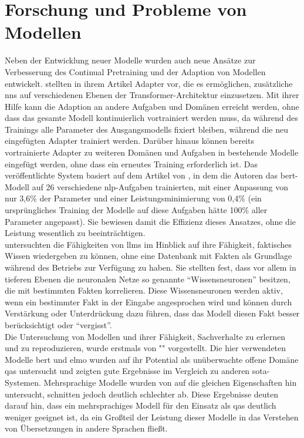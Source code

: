 \section{Forschung und Probleme von Modellen}
Neben der Entwicklung neuer Modelle wurden auch neue Ansätze zur Verbesserung des Continual Pretraining und der Adaption von Modellen entwickelt. 
\citet{adapterhub} stellten in ihrem Artikel Adapter vor, die es ermöglichen, zusätzliche \ac{nn}s auf verschiedenen Ebenen der Transformer-Architektur einzusetzen.
Mit ihrer Hilfe kann die Adaption an andere Aufgaben und Domänen erreicht werden, ohne dass das gesamte Modell kontinuierlich vortrainiert werden muss, da während des Trainings alle Parameter des Ausgangsmodells fixiert bleiben, während die neu eingefügten Adapter trainiert werden.
Darüber hinaus können bereits vortrainierte Adapter zu weiteren Domänen und Aufgaben in bestehende Modelle eingefügt werden, ohne dass ein erneutes Training erforderlich ist.
Das veröffentlichte System basiert auf dem Artikel von \citet{adapter_build_on}, in dem die Autoren das \ac{bert}-Modell auf 26 verschiedene \ac{nlp}-Aufgaben trainierten, mit einer Anpassung von nur 3,6\% der Parameter und einer Leistungsminimierung von 0,4\% (ein ursprüngliches Training der Modelle auf diese Aufgaben hätte 100\% aller Parameter angepasst). Sie bewiesen damit die Effizienz dieses Ansatzes, ohne die Leistung wesentlich zu beeinträchtigen.\\

\citet{knowledge_neurons} untersuchten die Fähigkeiten von \ac{llm}s im Hinblick auf ihre Fähigkeit, faktisches Wissen wiedergeben zu können, ohne eine Datenbank mit Fakten als Grundlage während des Betriebs zur Verfügung zu haben.
Sie stellten fest, dass vor allem in tieferen Ebenen die neuronalen Netze so genannte \enquote{Wissensneuronen} besitzen, die mit bestimmten Fakten korrelieren.
Diese Wissensneuronen werden aktiv, wenn ein bestimmter Fakt in der Eingabe angesprochen wird und können durch Verstärkung oder Unterdrückung dazu führen, dass das Modell diesen Fakt besser berücksichtigt oder \enquote{vergisst}.\\

Die Untersuchung von Modellen und ihrer Fähigkeit, Sachverhalte zu erlernen und zu reproduzieren, wurde erstmals von "\citet{knowledge_base}" vorgestellt.
Die hier verwendeten Modelle \ac{bert} und \ac{elmo} wurden auf ihr Potential als unüberwachte offene Domäne \ac{qas} untersucht und zeigten gute Ergebnisse im Vergleich zu anderen \ac{sota}-Systemen.
Mehrsprachige Modelle wurden von \citet{xfactr} auf die gleichen Eigenschaften hin untersucht, schnitten jedoch deutlich schlechter ab. Diese Ergebnisse deuten darauf hin, dass ein mehrsprachiges Modell für den Einsatz als \ac{qas} deutlich weniger geeignet ist, da ein Großteil der Leistung dieser Modelle in das Verstehen von Übersetzungen in andere Sprachen fließt.\\

